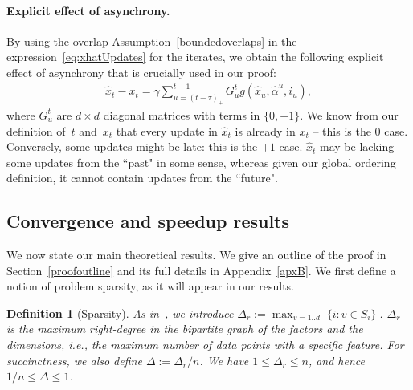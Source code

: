 \documentclass[twoside]{article}
\newcommand{\stepsize}{\gamma}
\newcommand{\overlap}{\tau}
\newcommand{\sparsity}{\Delta}
\newcommand{\sparsityr}{\Delta_r}
\newtheorem{definition}{Definition}
\begin{document}
\paragraph{Explicit effect of asynchrony.}
By using the overlap Assumption~\ref{boundedoverlaps} in the expression~\eqref{eq:xhatUpdates} for the iterates, we obtain the following explicit effect of asynchrony that is crucially used in our proof:
\begin{align}\label{eq:async}
\hat x_t - x_t = \stepsize \sum_{u=(t - \overlap)_+}^{t-1}G_{u}^t g(\hat x_{u}, \hat \alpha^u, i_{u}),
\end{align}
where $G_{u}^t$ are $d\times d$ diagonal matrices with terms in $\{0, +1\}$. 
We know from our definition of~$t$ and~$x_t$ that every update in $\hat x_t$ is already in $x_t$ -- this is the $0$ case. 
Conversely, some updates might be late: this is the $+1$ case. 
$\hat x_t$ may be lacking some updates from the ``past" in some sense, whereas given our global ordering definition, it cannot contain updates from the ``future".

\vspace{-1mm}
\subsection{Convergence and speedup results}
\vspace{-2mm}
We now state our main theoretical results. We give an outline of the proof in Section~\ref{proofoutline} and its full details in Appendix~\ref{apxB}.
We first define a notion of problem sparsity, as it will appear in our results.

\begin{definition}[Sparsity]
As in~\citet{hogwild}, we introduce $\sparsityr := \max_{v=1..d} |\{i : v \in S_i\}|$. $\sparsityr$ is 
the maximum right-degree in the bipartite graph of the factors and the dimensions, i.e., 
the maximum number of data points with a specific feature. For succinctness, we also define $\sparsity := \sparsityr / n$. We have $1 \leq \sparsityr \leq n$, and hence $1/n \leq \sparsity \leq 1$.

\end{definition}
\end{document}
